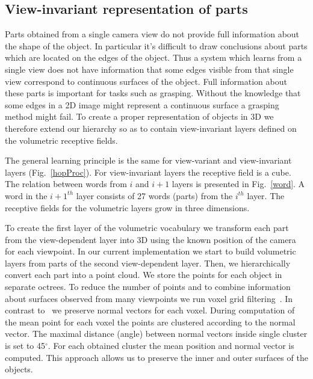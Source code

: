 \documentclass[letterpaper,10pt,conference]{ieeeconf}  %
\begin{document}
\subsection{View-invariant representation of parts}

Parts obtained from a single camera view do not provide full information about the shape of the object. In particular it's difficult to draw conclusions about parts which are located on the edges of the object. Thus a system which learns from a single view does not have information that some edges visible from that single view correspond to continuous surfaces of the object. Full information about these parts is important for tasks such as grasping. Without the knowledge that some edges in a 2D image might represent a continuous surface a grasping method might fail. To create a proper representation of objects in 3D we therefore extend our hierarchy so as to contain view-invariant layers defined on the volumetric receptive fields.


The general learning principle is the same for view-variant and view-invariant layers (Fig.~\ref{hopProc}). For view-invariant layers the receptive field is a cube. The relation between words from $i$ and $i+1$ layers is presented in Fig.~\ref{word}. A word in the $i+1^{th}$ layer consists of 27 words (parts) from the $i^{th}$ layer. The receptive fields for the volumetric layers grow in three dimensions.

To create the first layer of the volumetric vocabulary we transform each part from the view-dependent layer into 3D using the known position of the camera for each viewpoint. In our current implementation we start to build volumetric layers from parts of the second view-dependent layer. Then, we hierarchically convert each part into a point cloud. We store the points for each object in separate octrees. To reduce the number of points and to combine information about surfaces observed from many viewpoints we run voxel grid filtering~\cite{Aldoma2012}. In contrast to~\cite{Aldoma2012} we preserve normal vectors for each voxel. During computation of the mean point for each voxel the points are clustered according to the normal vector. The maximal distance (angle) between normal vectors inside single cluster is set to 45$^\circ$. For each obtained cluster the mean position and normal vector is computed. This approach allows us to preserve the inner and outer surfaces of the objects.
\end{document}
